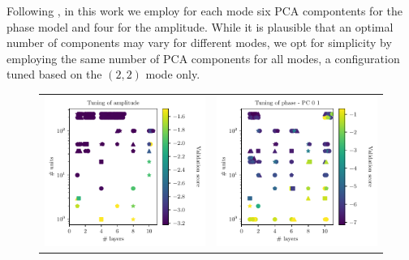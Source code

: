 \documentclass[twocolumn,showpacs,preprintnumbers,nofootinbib,prd,
superscriptaddress,10pt]{revtex4-2}
\begin{document}
Following \cite{Schmidt:2020yuu}, in this work we employ for each mode six PCA compontents for the phase model and four for the amplitude.
While it is plausible that an optimal number of components may vary for different modes, we opt for simplicity by employing the same number of PCA components for all modes, a configuration tuned based on the $(2,2)$ mode only.

\begin{figure}[t]
	\begin{tabular}{cc}
		\includegraphics[scale = 0.9]{tuning_amp} &
		\includegraphics[scale = 0.9]{tuning_ph_01} \\

\end{tabular}
\end{figure}
\end{document}
